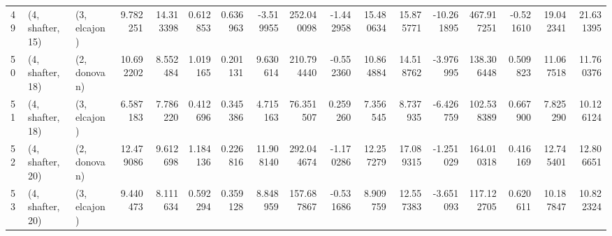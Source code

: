 \begin{tabular}{lllrrrrrrrrrrrrrr}
49 &  (4, shafter, 15) &     (3, elcajon) &   9.782251 &  14.313398 &   0.612853 &  0.636963 &  -3.519955 &  252.040098 & -1.442958 &  15.480634 &  15.875771 & -10.261895 &   467.917251 & -0.521610 &  19.042341 &  21.631395 \\
50 &  (4, shafter, 18) &     (2, donovan) &  10.692202 &   8.552484 &   1.019165 &  0.201131 &   9.630614 &  210.794440 & -0.552360 &  10.864884 &  14.518762 &  -3.976995 &   138.306448 &  0.509823 &  11.067518 &  11.760376 \\
51 &  (4, shafter, 18) &     (3, elcajon) &   6.587183 &   7.786220 &   0.412696 &  0.345386 &   4.715163 &   76.351507 &  0.259260 &   7.356545 &   8.737935 &  -6.426759 &   102.538389 &  0.667900 &   7.825290 &  10.126124 \\
52 &  (4, shafter, 20) &     (2, donovan) &  12.479086 &   9.612698 &   1.184136 &  0.226816 &  11.908140 &  292.044674 & -1.170286 &  12.257279 &  17.089315 &  -1.251029 &   164.010318 &  0.416169 &  12.745401 &  12.806651 \\
53 &  (4, shafter, 20) &     (3, elcajon) &   9.440473 &   8.111634 &   0.592294 &  0.359128 &   8.848959 &  157.687867 & -0.531686 &   8.909759 &  12.557383 &  -3.651093 &   117.122705 &  0.620611 &  10.187847 &  10.822324 \\
\bottomrule
\end{tabular}
